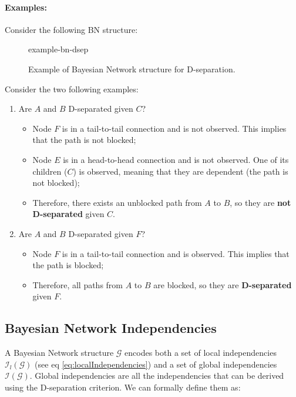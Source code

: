 \paragraph{Examples:}
Consider the following BN structure:
\begin{figure}[H]
\centering
    {example-bn-dsep}
    \caption{Example of Bayesian Network structure for D-separation.}
\end{figure}
Consider the two following examples:
\begin{enumerate}
    \item Are $A$ and $B$ D-separated given $C$?
    \begin{itemize}
        \item Node $F$ is in a tail-to-tail connection and is not observed. This implies that the path is not blocked;
        \item Node $E$ is in a head-to-head connection and is not observed. One of its children ($C$) is observed, meaning
        that they are dependent (the path is not blocked);
        \item Therefore, there exists an unblocked path from $A$ to $B$, so they are \textbf{not D-separated} given $C$.
    \end{itemize}
    \item Are $A$ and $B$ D-separated given $F$?
    \begin{itemize}
        \item Node $F$ is in a tail-to-tail connection and is observed. This implies that the path is blocked;
        \item Therefore, all paths from $A$ to $B$ are blocked, so they are \textbf{D-separated} given $F$.
    \end{itemize}
\end{enumerate}

\subsection{Bayesian Network Independencies}
A Bayesian Network structure $\mathcal{G}$ encodes both a set of local independencies $\mathcal{I}_l(\mathcal{G})$ (see eq \ref{eq:localIndependencies})
and a set of global independencies $\mathcal{I}(\mathcal{G})$.
Global independencies are all the independencies that can be derived using the D-separation criterion.
We can formally define them as:
\begin{figure}[H]
\end{figure}

